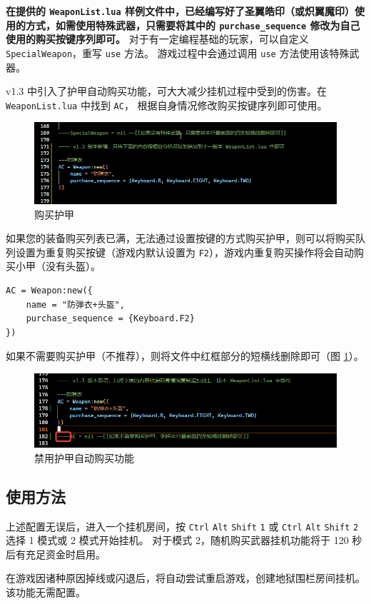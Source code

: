 \textbf{\color{red} 在提供的 \lstinline{WeaponList.lua} 样例文件中，已经编写好了圣翼皓印（或炽翼魔印）使用的方式，如需使用特殊武器，只需要将其中的 \lstinline{purchase_sequence} 修改为自己使用的购买按键序列即可。}
对于有一定编程基础的玩家，可以自定义 \lstinline{SpecialWeapon}，重写 \lstinline{use} 方法。
游戏过程中会通过调用 \lstinline{use} 方法使用该特殊武器。

v1.3 中引入了护甲自动购买功能，可大大减少挂机过程中受到的伤害。在 \lstinline{WeaponList.lua} 中找到 \lstinline{AC}， 根据自身情况修改购买按键序列即可使用。

\begin{figure}
    \Centering
    \includegraphics[width=\textwidth]{docs/assets/buy_ac.png}
    \caption{购买护甲}
\end{figure}

如果您的装备购买列表已满，无法通过设置按键的方式购买护甲，则可以将购买队列设置为重复购买按键（游戏内默认设置为 \lstinline{F2}），游戏内重复购买操作将会自动购买小甲（没有头盔）。

\begin{verbatim}
AC = Weapon:new({
    name = "防弹衣+头盔",
    purchase_sequence = {Keyboard.F2}
})
\end{verbatim}

如果不需要购买护甲（不推荐），则将文件中红框部分的短横线删除即可（图 \ref{ch2fig-delete-ac}）。

\begin{figure}
    \Centering
    \includegraphics[width=\textwidth]{docs/assets/delete_AC.png}
    \caption{禁用护甲自动购买功能}
    \label{ch2fig-delete-ac}
\end{figure}

\subsection{使用方法}

上述配置无误后，进入一个挂机房间，按 \lstinline{Ctrl} \lstinline{Alt} \lstinline{Shift} \lstinline{1} 或 \lstinline{Ctrl} \lstinline{Alt} \lstinline{Shift} \lstinline{2} 选择 1 模式或 2 模式开始挂机。
对于模式 2，随机购买武器挂机功能将于 120 秒后有充足资金时启用。

在游戏因诸种原因掉线或闪退后，将自动尝试重启游戏，创建地狱围栏房间挂机。该功能无需配置。